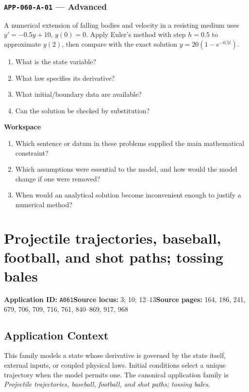 \documentclass[11pt]{book}
\newcommand{\pid}[1]{\texttt{#1}}
\newcommand{\workspace}{\par\vspace{0.7in}\hrulefill\par\vspace{0.55in}\hrulefill\par}
\begin{document}
\subsection*{\pid{APP-060-A-01} — Advanced}
\begin{problembox}
A numerical extension of falling bodies and velocity in a resisting medium uses $y'=-0.5y+10$, $y(0)=0$. Apply Euler's method with step $h=0.5$ to approximate $y(2)$, then compare with the exact solution $y=20(1-e^{-0.5t})$.
\end{problembox}
\begin{promptbox}\begin{enumerate}
\item What is the state variable?
\item What law specifies its derivative?
\item What initial/boundary data are available?
\item Can the solution be checked by substitution?
\end{enumerate}\end{promptbox}
\textbf{Workspace}\workspace
\begin{reflectionbox}\begin{enumerate}
\item Which sentence or datum in these problems supplied the main mathematical constraint?
\item Which assumptions were essential to the model, and how would the model change if one were removed?
\item When would an analytical solution become inconvenient enough to justify a numerical method?
\end{enumerate}\end{reflectionbox}
\chapter{Projectile trajectories, baseball, football, and shot paths; tossing bales}\label{app:A061}
\textbf{Application ID:} \pid{A061}\quad \textbf{Source locus:} 3; 10; 12–13\quad \textbf{Source pages:} 164, 186, 241, 679, 706, 709, 716, 761, 840–869, 917, 968
\section*{Application Context}
This family models a state whose derivative is governed by the state itself, external inputs, or coupled physical laws. Initial conditions select a unique trajectory when the model permits one. The canonical application family is \emph{Projectile trajectories, baseball, football, and shot paths; tossing bales}.
\end{document}
